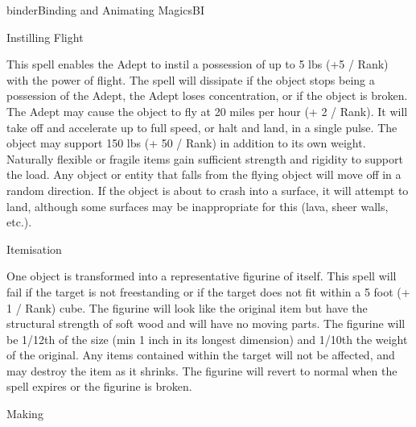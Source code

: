 \begin{College}[1.2]{binder}{Binding and Animating Magics}{BI}
\begin{spell}[S-6]{Instilling Flight}
\begin{effects}
This spell enables the Adept to instil a possession of up to 5 lbs (+5
/ Rank) with the power of flight.  The spell will dissipate if the
object stops being a possession of the Adept, the Adept loses
concentration, or if the object is broken.  The Adept may cause the
object to fly at 20 miles per hour (+ 2 / Rank).  It will take off and
accelerate up to full speed, or halt and land, in a single pulse. The
object may support 150 lbs (+ 50 / Rank) in addition to its own
weight.  Naturally flexible or fragile items gain sufficient strength
and rigidity to support the load.  Any object or entity that falls
from the flying object will move off in a random direction.  If the
object is about to crash into a surface, it will attempt to land,
although some surfaces may be inappropriate for this (lava, sheer
walls, etc.).
\end{effects}
\end{spell}

\begin{spell}[S-7]{Itemisation}
\begin{effects}
One object is transformed into a representative figurine of itself.
This spell will fail if the target is not freestanding or if the
target does not fit within a 5 foot (+ 1 / Rank) cube. The figurine
will look like the original item but have the structural strength of
soft wood and will have no moving parts. The figurine will be 1/12th
of the size (min 1 inch in its longest dimension) and 1/10th the
weight of the original. Any items contained within the target will not
be affected, and may destroy the item as it shrinks.  The figurine
will revert to normal when the spell expires or the figurine is
broken.
\end{effects}
\end{spell}

\begin{spell}[S-8]{Making}


\end{spell}
\end{College}
